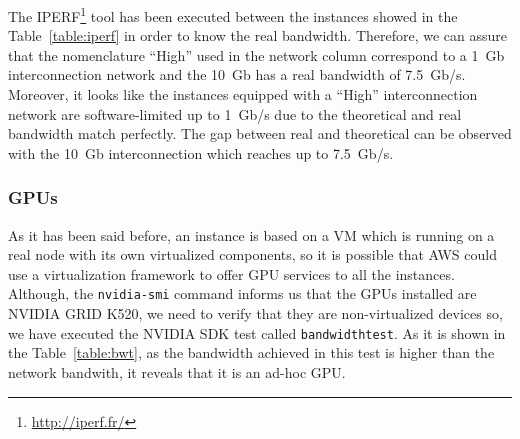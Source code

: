 \documentclass[a4paper,twoside]{article}
\begin{document}
The IPERF\footnote{\url{http://iperf.fr/}} tool has been executed between the instances showed in 
the Table~\ref{table:iperf} in order to know the real bandwidth.
Therefore, we can assure that the nomenclature ``High'' used in the 
network column correspond to a 1~Gb interconnection network and the 10~Gb has 
a real bandwidth of 7.5~Gb/s.
Moreover, it looks like the instances equipped with a ``High'' interconnection network
are software-limited up to 1~Gb/s due to the theoretical and real bandwidth 
match perfectly. The gap between real and theoretical can be observed with 
the 10~Gb interconnection which reaches up to 7.5~Gb/s.


\subsubsection{GPUs}
As it has been said before, an instance is based on a VM which is running on a real node with its own virtualized components, so it is possible that AWS could use a virtualization framework to offer GPU services to all the instances.
Although, the {\tt nvidia-smi} command informs us that the GPUs installed are NVIDIA GRID K520, we need to verify that they are non-virtualized devices so, we have executed the NVIDIA SDK test called {\tt bandwidthtest}. 
As it is shown in the Table~\ref{table:bwt}, as the bandwidth achieved in this test is higher than the network bandwith, it reveals that it is an ad-hoc GPU. 
\end{document}
